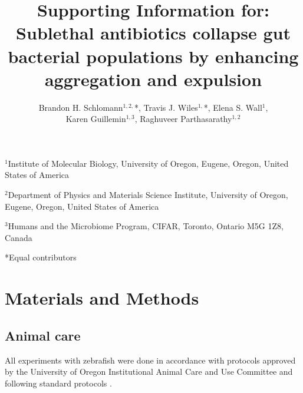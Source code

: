 \documentclass[12pt]{article}
\begin{document}
\title{Supporting Information for: Sublethal antibiotics collapse gut bacterial populations by enhancing aggregation and expulsion}

\author{Brandon H. Schlomann$^{1,2,}$*, Travis J. Wiles$^{1,}$*, Elena S. Wall$^{1}$, \\
Karen Guillemin$^{1,3}$, Raghuveer Parthasarathy$^{1,2}$}
\date{}

\maketitle
\setlength\parskip{12pt}
\setlength\parindent{0pt}



$^1$Institute of Molecular Biology, University of Oregon, Eugene, Oregon, United States of America 

$^2$Department of Physics and Materials Science Institute, University of Oregon, Eugene, Oregon, United States of America 

$^3$Humans and the Microbiome Program, CIFAR, Toronto,  Ontario M5G 1Z8, Canada

*Equal contributors


\section*{Materials and Methods}

\subsection*{Animal care}
All experiments with zebrafish were done in accordance with protocols approved by the University of Oregon Institutional Animal Care and Use Committee and following standard protocols \cite{Westerfield2007}. 
\end{document}
